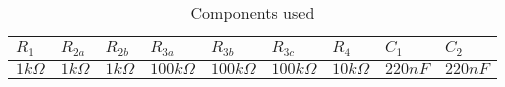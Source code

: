 \begin{table}[h]
\centering
\begin{tabular}{|l|l|l|l|l|l|l|l|l|}
\hline
$R_{1}$    & $R_{2a}$   & $R_{2b}$   & $R_{3a}$     & $R_{3b}$     & $R_{3c}$     & $R_{4}$     & $C_{1}$ & $C_{2}$ \\ \hline
$1k\Omega$ & $1k\Omega$ & $1k\Omega$ & $100k\Omega$ & $100k\Omega$ & $100k\Omega$ & $10k\Omega$ & $220nF$ & $220nF$ \\ \hline
\end{tabular}
\caption{Components used}
\label{tab:my-table}
\end{table}
